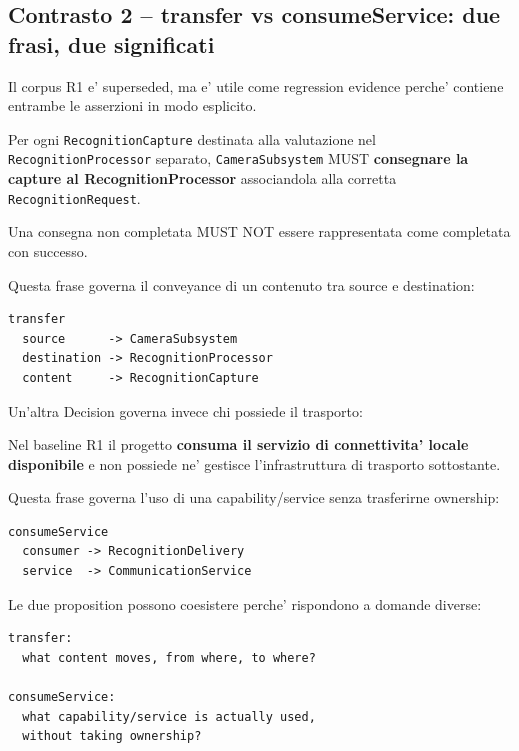 \documentclass[11pt,a4paper]{article}
\newcommand{\code}[1]{\nolinkurl{#1}}
\begin{document}
\subsection{Contrasto 2 -- transfer vs consumeService: due frasi, due significati}

Il corpus R1 e' superseded, ma e' utile come regression evidence perche' contiene entrambe le asserzioni in modo esplicito.

\begin{sourcebox}
Per ogni \code{RecognitionCapture} destinata alla valutazione nel \code{RecognitionProcessor} separato, \code{CameraSubsystem} MUST \textbf{consegnare la capture al RecognitionProcessor} associandola alla corretta \code{RecognitionRequest}.

Una consegna non completata MUST NOT essere rappresentata come completata con successo.
\end{sourcebox}

Questa frase governa il conveyance di un contenuto tra source e destination:

\begin{goodbox}
\begin{lstlisting}
transfer
  source      -> CameraSubsystem
  destination -> RecognitionProcessor
  content     -> RecognitionCapture
\end{lstlisting}
\end{goodbox}

Un'altra Decision governa invece chi possiede il trasporto:

\begin{sourcebox}
Nel baseline R1 il progetto \textbf{consuma il servizio di connettivita' locale disponibile} e non possiede ne' gestisce l'infrastruttura di trasporto sottostante.
\end{sourcebox}

Questa frase governa l'uso di una capability/service senza trasferirne ownership:

\begin{goodbox}
\begin{lstlisting}
consumeService
  consumer -> RecognitionDelivery
  service  -> CommunicationService
\end{lstlisting}
\end{goodbox}

Le due proposition possono coesistere perche' rispondono a domande diverse:

\begin{lstlisting}
transfer:
  what content moves, from where, to where?

consumeService:
  what capability/service is actually used,
  without taking ownership?
\end{lstlisting}
\end{document}
